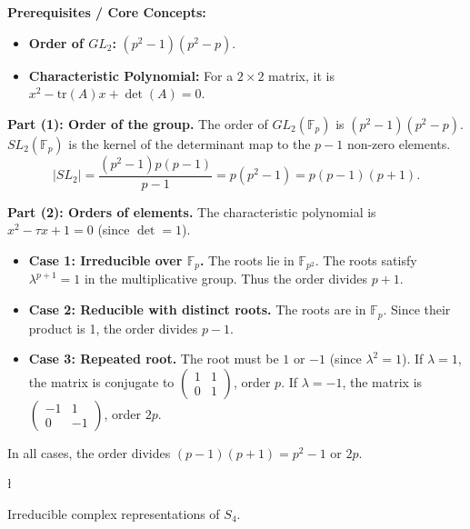 \begin{solution}
\textbf{Prerequisites / Core Concepts:}
\begin{itemize}
    \item \textbf{Order of $GL_2$:} $(p^2-1)(p^2-p)$.
    \item \textbf{Characteristic Polynomial:} For a $2 \times 2$ matrix, it is $x^2 - \text{tr}(A)x + \det(A) = 0$.
\end{itemize}

\textbf{Part (1): Order of the group.}
The order of $GL_2(\mathbb{F}_p)$ is $(p^2-1)(p^2-p)$.
$SL_2(\mathbb{F}_p)$ is the kernel of the determinant map to the $p-1$ non-zero elements.
\[ |SL_2| = \frac{(p^2-1)p(p-1)}{p-1} = p(p^2-1) = p(p-1)(p+1). \]

\textbf{Part (2): Orders of elements.}
The characteristic polynomial is $x^2 - \tau x + 1 = 0$ (since $\det=1$).
\begin{itemize}
    \item \textbf{Case 1: Irreducible over $\mathbb{F}_p$.} The roots lie in $\mathbb{F}_{p^2}$. The roots satisfy $\lambda^{p+1} = 1$ in the multiplicative group. Thus the order divides $p+1$.
    \item \textbf{Case 2: Reducible with distinct roots.} The roots are in $\mathbb{F}_p$. Since their product is 1, the order divides $p-1$.
    \item \textbf{Case 3: Repeated root.} The root must be $1$ or $-1$ (since $\lambda^2=1$).
      If $\lambda=1$, the matrix is conjugate to $\begin{pmatrix} 1 & 1 \\ 0 & 1 \end{pmatrix}$, order $p$.
      If $\lambda=-1$, the matrix is $\begin{pmatrix} -1 & 1 \\ 0 & -1 \end{pmatrix}$, order $2p$.
\end{itemize}
In all cases, the order divides $(p-1)(p+1) = p^2-1$ or $2p$.
\end{solution}

\begin{exercise}
\l\label{2013:7}

\label{algebra:2013:7}Irreducible complex representations of $S_4$.
\end{exercise}

